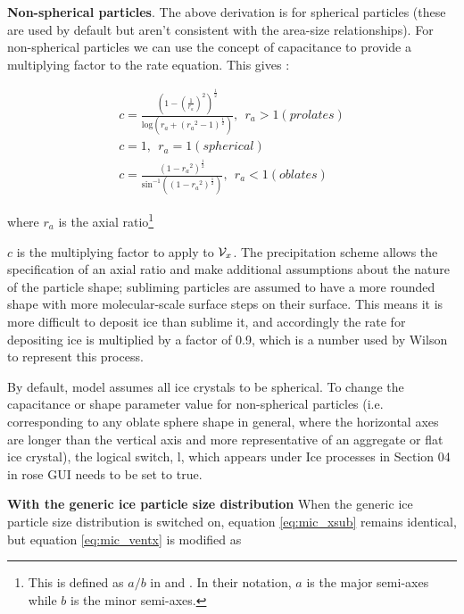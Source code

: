 \documentclass{UMDP_article}
\begin{document}
\textbf{Non-spherical particles}. The above derivation is for spherical particles
(these are used by default but aren't consistent with the area-size relationships).
For non-spherical particles we can use the concept of capacitance to provide
a multiplying factor to the rate equation. This gives \citep{Rogers:Yau:1989}:

\begin{eqnarray}
c =  \frac{  {\left(1 - \left( {\frac{1}{r_a}} \right)^2 \right) }^{ \frac{1}{2}} }
          {\mathrm{log} \left( r_a + {\left( {r_a}^2 -1 \right)}^{\frac{1}{2}} \right)},
          ~~r_a > 1 (prolates) \\
c = 1,~~r_a = 1 (spherical) \\
c = \frac{ {\left( 1 - {r_a}^2 \right)}^{\frac{1}{2}}}
         {\mathrm{sin}^{-1} \left( {\left( 1 - {r_a}^2 \right)}^{\frac{1}{2}} \right) },
          ~~r_a < 1 (oblates) 
\end{eqnarray}

where $r_a$ is the axial ratio\footnote{This is defined as $a/b$ in \cite{Rogers:Yau:1989}
and \cite{pruppacher:klett}. In their notation, $a$ is the major semi-axes while $b$ 
is the minor semi-axes.} 


$c$ is the multiplying factor to apply to ${\cal V}_x$. The 
precipitation scheme allows the specification of an axial ratio and make 
additional assumptions about the nature of the particle shape;
subliming particles are assumed to have a more rounded shape with more 
molecular-scale
surface steps on their surface. This means it is more difficult to deposit ice than
sublime it, and accordingly the rate for depositing ice is multiplied by
a factor of 0.9, which is a number used by Wilson to represent this process.

By default, model assumes all ice crystals to be spherical. To change the capacitance or
shape parameter value for non-spherical particles (i.e. corresponding to any oblate sphere shape in general,
where the horizontal axes are longer than the vertical axis and more representative of an
aggregate or flat ice crystal), the logical switch, 
{l},
which appears under Ice processes in Section {04} in rose GUI needs to be set to true.

\textbf{With the generic ice particle size distribution} When the
generic ice particle size distribution is switched on, equation \ref{eq:mic_xsub} 
remains identical, but equation \ref{eq:mic_ventx} is modified as
\end{document}
